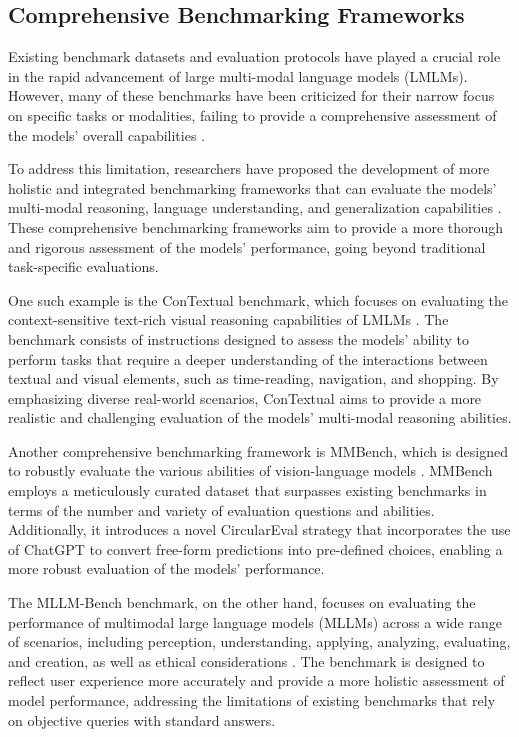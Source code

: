 \documentclass[11pt]{article}
\begin{document}
\subsection{Comprehensive Benchmarking Frameworks}

Existing benchmark datasets and evaluation protocols have played a crucial role in the rapid advancement of large multi-modal language models (LMLMs). However, many of these benchmarks have been criticized for their narrow focus on specific tasks or modalities, failing to provide a comprehensive assessment of the models' overall capabilities \cite{ref54,ref151}.

To address this limitation, researchers have proposed the development of more holistic and integrated benchmarking frameworks that can evaluate the models' multi-modal reasoning, language understanding, and generalization capabilities \cite{ref152,ref55}. These comprehensive benchmarking frameworks aim to provide a more thorough and rigorous assessment of the models' performance, going beyond traditional task-specific evaluations.

One such example is the ConTextual benchmark, which focuses on evaluating the context-sensitive text-rich visual reasoning capabilities of LMLMs \cite{ref152}. The benchmark consists of instructions designed to assess the models' ability to perform tasks that require a deeper understanding of the interactions between textual and visual elements, such as time-reading, navigation, and shopping. By emphasizing diverse real-world scenarios, ConTextual aims to provide a more realistic and challenging evaluation of the models' multi-modal reasoning abilities.

Another comprehensive benchmarking framework is MMBench, which is designed to robustly evaluate the various abilities of vision-language models \cite{ref55}. MMBench employs a meticulously curated dataset that surpasses existing benchmarks in terms of the number and variety of evaluation questions and abilities. Additionally, it introduces a novel CircularEval strategy that incorporates the use of ChatGPT to convert free-form predictions into pre-defined choices, enabling a more robust evaluation of the models' performance.

The MLLM-Bench benchmark, on the other hand, focuses on evaluating the performance of multimodal large language models (MLLMs) across a wide range of scenarios, including perception, understanding, applying, analyzing, evaluating, and creation, as well as ethical considerations \cite{ref151}. The benchmark is designed to reflect user experience more accurately and provide a more holistic assessment of model performance, addressing the limitations of existing benchmarks that rely on objective queries with standard answers.
\end{document}
